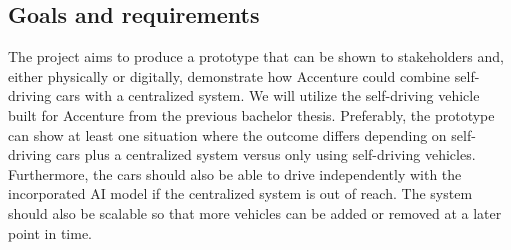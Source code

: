 \subsection{Goals and requirements}\label{sec:goals}
The project aims to produce a prototype that can be shown to stakeholders and, either physically or digitally, demonstrate how Accenture could combine self-driving cars with a centralized system. We will utilize the self-driving vehicle built for Accenture from the previous bachelor thesis. Preferably, the prototype can show at least one situation where the outcome differs depending on self-driving cars plus a centralized system versus only using self-driving vehicles. Furthermore, the cars should also be able to drive independently with the incorporated AI model if the centralized system is out of reach. The system should also be scalable so that more vehicles can be added or removed at a later point in time. 
